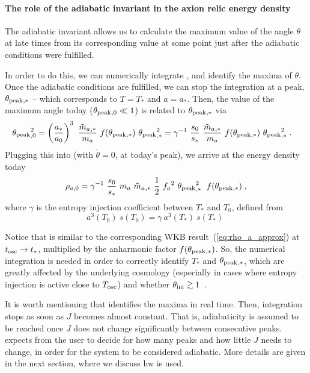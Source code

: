 \documentclass[11pt,a4paper]{article}
\begin{document}
\paragraph{The role of the adiabatic invariant in the axion relic energy density}
%
The adiabatic invariant allows us to calculate the maximum value of the angle $\theta$ at late times from its corresponding value at some point just after the adiabatic conditions were fulfilled.

In order to do this, we can numerically integrate , and identify the maxima of $\theta$. Once the adiabatic conditions are fulfilled, we can stop the integration at a peak, $\theta_{\rm peak}{}_{,*}$ -- which corresponds to $T=T_{*}$ and $a=a_{*}$. Then, the value of the maximum angle today ($\theta_{\rm peak}{}_{,0} \ll 1$) is related to $\theta_{\rm peak}{}_{,*}$ via
%
\begin{eqnarray}
	\thetamax_{,0}^2 &=  \lrb{\dfrac{a_*}{a_0}}^3 \ \dfrac{\maT_{,*}}{\ma} \ f(\thetamax_{,*}) \ \thetamax_{,*}^2  =
	\gamma^{-1} \ \dfrac{s_0}{s_*} \ \dfrac{\maT_{,*}}{\ma} \ f(\thetamax_{,*}) \ \thetamax_{,*}^2 
	\; .
	\label{eq:theta_relation}
\end{eqnarray}
%
Plugging this into  (with $\dot \theta=0$, \ie at today's peak), we arrive at the energy density today 
%
\begin{equation}
	\rho_{a,0} = \gamma^{-1} \ \dfrac{s_0}{s_*} \ \ma \ \maT_{,*} \ \dfrac{1}{2} \ \fa^2 \ \thetamax_{,*}^2 \;  \ f(\thetamax_{,*}) \;,
	\label{eq:rho_axion_exact}
\end{equation}
%
where $\gamma$ is the entropy injection coefficient between $T_{*}$ and $T_0$, defined from 
%
\begin{equation}
	a^3(T_0) \ s(T_0) = \gamma \ a^3(T_*) \ s(T_*) \;
	\label{eq:entropy_injection_gamma}
\end{equation}

Notice that  is similar to the corresponding WKB result~(\ref{eq:rho_a_approx}) at $t_{\rm osc}{} \to t_*$, multiplied by the anharmonic factor $f(\theta_{\rm peak}{}_{,*})$. So, the numerical integration is needed in order to correctly identify $T_{*}$ and $\theta_{\rm peak}{}_{,*}$, which are greatly affected by the underlying cosmology (especially in cases where entropy injection is active close to $T_{\rm osc}{}$) and whether $\theta_{\rm ini}{} \gtrsim 1$~\cite{Bae:2008ue,Arias:2021rer}. 

It is worth mentioning that \mimes identifies the maxima in real time. Then, integration stops as soon as $J$ becomes almost constant. That is, adiabaticity is assumed to be reached once $J$ does not change significantly between consecutive peaks. \mimes expects from the user to decide  for  how many peaks and how little $J$ needs to change, in order for the system to be considered adiabatic. More details are given in the next section, where we discuss hw \mimes is used.
\end{document}
